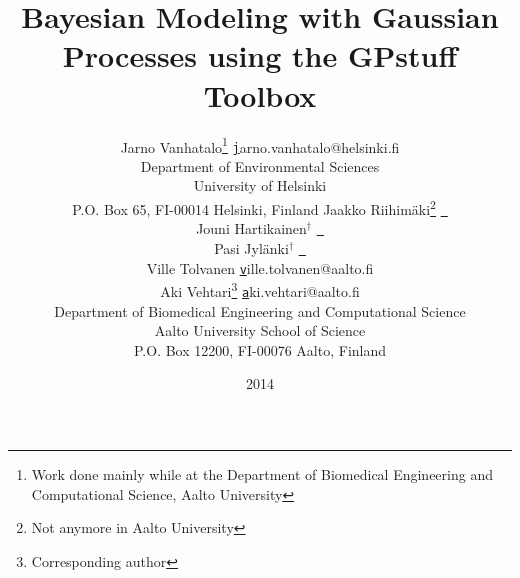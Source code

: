\documentclass[twoside,11pt]{article}
\newcommand{\pkg}[1]{{\fontseries{b}\selectfont #1}}
\newcommand{\email}[1]{\href{mailto:#1}{\normalfont\texttt{#1}}}
\begin{document}
\title{Bayesian Modeling with Gaussian Processes using the
   \pkg{GPstuff} Toolbox}

\date{2014}

\author{\name Jarno Vanhatalo\thanks{Work done mainly while at the
    Department of Biomedical
    Engineering and Computational Science, Aalto University} \email jarno.vanhatalo@helsinki.fi \\
  \addr Department of Environmental Sciences\\
  University of Helsinki\\
  P.O. Box 65, FI-00014 Helsinki, Finland \AND
  \name Jaakko Riihim\"aki\thanks{Not anymore in Aalto University} \email { } \\
  \name Jouni Hartikainen$^{\dagger}$ \email { } \\
  \name Pasi Jyl\"anki$^{\dagger}$ \email { } \\
  \name Ville Tolvanen \email ville.tolvanen@aalto.fi \\
  \name Aki Vehtari\thanks{Corresponding author} \email aki.vehtari@aalto.fi \\
  \addr Department of Biomedical Engineering and Computational Science\\
  Aalto University School of Science\\
  P.O. Box 12200, FI-00076 Aalto, Finland}

\maketitle
\end{document}
